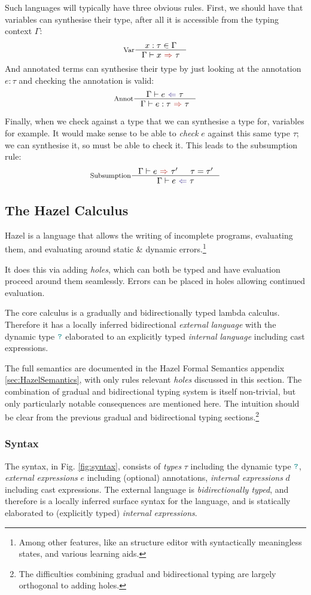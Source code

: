 Such languages will typically have three obvious rules. First, we should have that variables can synthesise their type, after all it is accessible from the typing context $\Gamma$:
\[\inference[Var]{x : \tau \in \Gamma}{\synthesis{x}{\tau}}\]
And annotated terms can synthesise their type by just looking at the annotation $e : \tau$ and checking the annotation is valid:
\[\inference[Annot]{\analysis{e}{\tau}}{\synthesis{e : \tau}{\tau}}\]

Finally, when we check against a type that we can synthesise a type for, variables for example.
It would make sense to be able to \textit{check} $e$ against this same type $\tau$; we can synthesise it, so must be able to check it. This leads to the subsumption rule:
\[\inference[Subsumption]{\synthesis{e}{\tau'} & \tau = \tau'}{\analysis{e}{\tau}}\]

\subsection{The Hazel Calculus}\label{sec:CoreHazel}
Hazel is a language that allows the writing of incomplete programs, evaluating them, and evaluating around static \& dynamic errors.\footnote{Among other features, like an structure editor with syntactically meaningless states, and various learning aids.}

It does this via adding \textit{holes}, which can both be typed and have evaluation proceed around them seamlessly. Errors can be placed in holes allowing continued evaluation.

The core calculus \cite{HazelLivePaper} is a gradually and bidirectionally typed lambda calculus. Therefore it has a locally inferred bidirectional \textit{external language} with the dynamic type ${\color{teal}\texttt{?}}$ elaborated to an explicitly typed \textit{internal language} including cast expressions. 

The full semantics are documented in the Hazel Formal Semantics appendix \ref{sec:HazelSemantics}, with only rules relevant \textit{holes} discussed in this section. The combination of gradual and bidirectional typing system is itself non-trivial, but only particularly notable consequences are mentioned here. The intuition should be clear from the previous gradual and bidirectional typing sections.\footnote{The difficulties combining gradual and bidirectional typing are largely orthogonal to adding holes.}

\subsubsection{Syntax}\label{sec:HazelSyntax}
\par The syntax, in Fig. \ref{fig:syntax}, consists of \textit{types} $\tau$ including the dynamic type ${\color{teal}\texttt{?}}$, \textit{external expressions} $e$ including (optional) annotations, \textit{internal expressions} $d$ including cast expressions. The external language is \textit{bidirectionally typed}, and therefore is a locally inferred surface syntax for the language, and is statically elaborated to (explicitly typed) \textit{internal expressions}.

